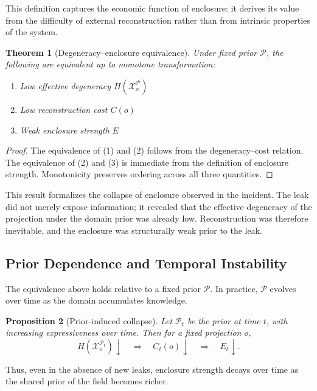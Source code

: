 \documentclass[12pt, oneside]{article}
\theoremstyle{plain}
\newtheorem{theorem}{Theorem}[section]
\newtheorem{proposition}[theorem]{Proposition}
\theoremstyle{definition}
\theoremstyle{remark}
\newcommand{\config}{\mathcal{X}}
\newcommand{\prior}{\mathcal{P}}
\begin{document}
This definition captures the economic function of enclosure: it derives its value
from the difficulty of external reconstruction rather than from intrinsic properties
of the system.

\begin{theorem}[Degeneracy--enclosure equivalence]
Under fixed prior $\prior$, the following are equivalent up to monotone transformation:
\begin{enumerate}[leftmargin=2em]
\item Low effective degeneracy $H(\config_o^{\prior})$
\item Low reconstruction cost $C(o)$
\item Weak enclosure strength $E$
\end{enumerate}
\end{theorem}

\begin{proof}
The equivalence of (1) and (2) follows from the degeneracy--cost relation. The
equivalence of (2) and (3) is immediate from the definition of enclosure strength.
Monotonicity preserves ordering across all three quantities.
\end{proof}

This result formalizes the collapse of enclosure observed in the incident. The leak
did not merely expose information; it revealed that the effective degeneracy of the
projection under the domain prior was already low. Reconstruction was therefore
inevitable, and the enclosure was structurally weak prior to the leak.

\subsection{Prior Dependence and Temporal Instability}

The equivalence above holds relative to a fixed prior $\prior$. In practice, $\prior$
evolves over time as the domain accumulates knowledge.

\begin{proposition}[Prior-induced collapse]
Let $\prior_t$ be the prior at time $t$, with increasing expressiveness over time.
Then for a fixed projection $o$,
\[
  H(\config_o^{\prior_t}) \downarrow \quad \Rightarrow \quad C_t(o) \downarrow \quad \Rightarrow \quad E_t \downarrow.
\]
\end{proposition}

Thus, even in the absence of new leaks, enclosure strength decays over time as the
shared prior of the field becomes richer.
\end{document}
